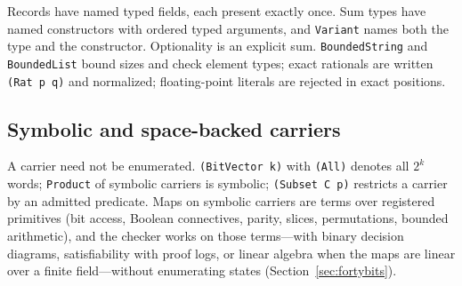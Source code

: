 \documentclass[11pt]{article}
\newcommand{\code}[1]{\texttt{#1}}
\theoremstyle{definition}
\theoremstyle{plain}
\begin{document}
Records have named typed fields, each present exactly once. Sum types have named constructors
with ordered typed arguments, and \code{Variant} names both the type and the constructor.
Optionality is an explicit sum. \code{BoundedString} and \code{BoundedList} bound sizes and check
element types; exact rationals are written \code{(Rat p q)} and normalized; floating-point
literals are rejected in exact positions.

\subsection{Symbolic and space-backed carriers}\label{sec:symbolic}

A carrier need not be enumerated. \code{(BitVector k)} with \code{(All)} denotes all $2^k$ words;
\code{Product} of symbolic carriers is symbolic; \code{(Subset C p)} restricts a carrier by an
admitted predicate. Maps on symbolic carriers are terms over registered primitives (bit access,
Boolean connectives, parity, slices, permutations, bounded arithmetic), and the checker works on
those terms---with binary decision diagrams, satisfiability with proof logs, or linear algebra
when the maps are linear over a finite field---without enumerating states
(Section~\ref{sec:fortybits}).
\end{document}
